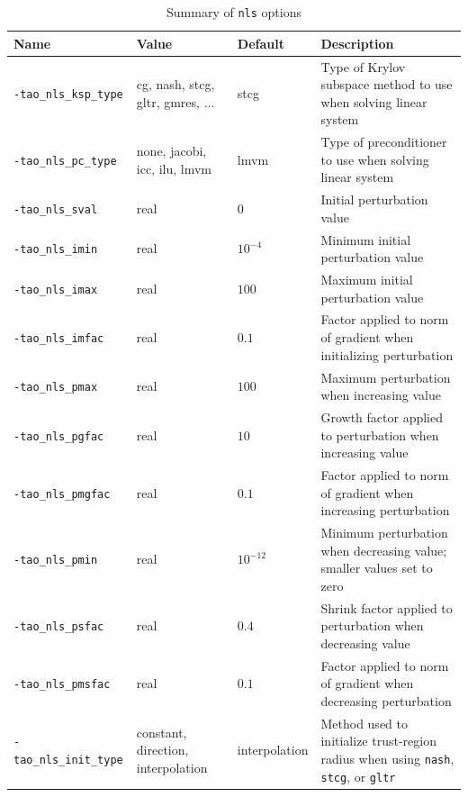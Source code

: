 \documentclass[]{book}
\begin{document}
\begin{table}[h]
\caption{Summary of {\tt nls} options}
\label{table:nlsoptions}
\vspace{5mm}
\begin{tabular}{l|p{1.5in}|l|p{2.0in}}
\hline
Name \rule{0pt}{2.6ex} & Value & Default & Description \\
\hline
{\tt -tao\_nls\_ksp\_type} \rule{0pt}{2.6ex} & cg, nash, stcg, gltr, gmres, ... & stcg & Type of Krylov subspace method to use when solving linear system \\
{\tt -tao\_nls\_pc\_type} & none, jacobi, icc, ilu, lmvm & lmvm & Type of preconditioner to use when solving linear system \\
{\tt -tao\_nls\_sval} & real & $0$ & Initial perturbation value \\
{\tt -tao\_nls\_imin} & real & $10^{-4}$ & Minimum initial perturbation value \\
{\tt -tao\_nls\_imax} & real & $100$ & Maximum initial perturbation value \\
{\tt -tao\_nls\_imfac} & real & $0.1$ & Factor applied to norm of gradient when initializing perturbation \\
{\tt -tao\_nls\_pmax} & real & $100$ & Maximum perturbation when increasing value \\
{\tt -tao\_nls\_pgfac} & real & $10$ & Growth factor applied to perturbation when increasing value \\
{\tt -tao\_nls\_pmgfac} & real & $0.1$ & Factor applied to norm of gradient when increasing perturbation \\
{\tt -tao\_nls\_pmin} & real & $10^{-12}$ & Minimum perturbation when decreasing value; smaller values set to zero \\
{\tt -tao\_nls\_psfac} & real & $0.4$ & Shrink factor applied to perturbation when decreasing value \\
{\tt -tao\_nls\_pmsfac} & real & $0.1$ & Factor applied to norm of gradient when decreasing perturbation \\
{\tt -tao\_nls\_init\_type} & constant, direction, interpolation &
interpolation & Method used to initialize trust-region radius when using
{\tt nash}, {\tt stcg}, or {\tt gltr} \\
\hline
\end{tabular}
\end{table}
\afterpage{\clearpage}
\end{document}
